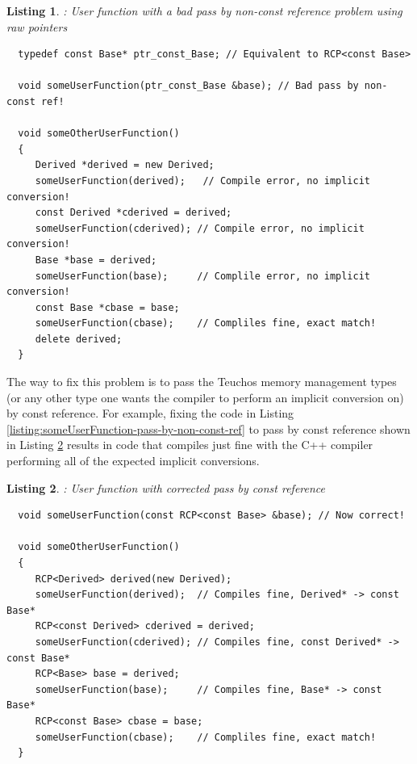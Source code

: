 \documentclass[pdf,ps2pdf,11pt]{SANDreport}
\newtheorem{listing}{Listing}
\begin{document}
{}\begin{listing}: User function with a bad pass by non-const
reference problem using raw pointers
\label{listing:someUserFunction-pass-by-non-const-ref-raw-ptr}
{\small\begin{verbatim}
  typedef const Base* ptr_const_Base; // Equivalent to RCP<const Base>

  void someUserFunction(ptr_const_Base &base); // Bad pass by non-const ref!

  void someOtherUserFunction()
  {
     Derived *derived = new Derived;
     someUserFunction(derived);   // Compile error, no implicit conversion!
     const Derived *cderived = derived;
     someUserFunction(cderived); // Compile error, no implicit conversion!
     Base *base = derived;
     someUserFunction(base);     // Complile error, no implicit conversion!
     const Base *cbase = base;
     someUserFunction(cbase);    // Compliles fine, exact match!
     delete derived;
  }
\end{verbatim}}
\end{listing}


The way to fix this problem is to pass the Teuchos memory management
types (or any other type one wants the compiler to perform an implicit
conversion on) by const reference.  For example, fixing the code in
Listing {}\ref{listing:someUserFunction-pass-by-non-const-ref} to pass
by const reference shown in Listing
{}\ref{listing:someUserFunction-pass-by-const-ref} results in code
that compiles just fine with the C++ compiler performing all of the
expected implicit conversions.


{}\begin{listing}: User function with corrected pass by const
reference
\label{listing:someUserFunction-pass-by-const-ref}
{\small\begin{verbatim}
  void someUserFunction(const RCP<const Base> &base); // Now correct!

  void someOtherUserFunction()
  {
     RCP<Derived> derived(new Derived);
     someUserFunction(derived);  // Compiles fine, Derived* -> const Base*
     RCP<const Derived> cderived = derived;
     someUserFunction(cderived); // Compiles fine, const Derived* -> const Base*
     RCP<Base> base = derived;
     someUserFunction(base);     // Compiles fine, Base* -> const Base*
     RCP<const Base> cbase = base;
     someUserFunction(cbase);    // Compliles fine, exact match!
  }
\end{verbatim}}
\end{listing}
\end{document}
